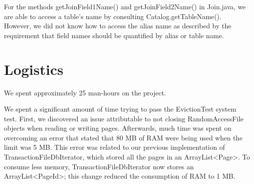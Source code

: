 \documentclass[paper=a4, fontsize=11pt]{scrartcl} %
\numberwithin{equation}{section} %
\numberwithin{figure}{section} %
\numberwithin{table}{section} %
\begin{document}
For the methods getJoinField1Name() and getJoinField2Name() in Join.java, we are able to access a table's name by consulting Catalog.getTableName(). However, we did not know how to access the alias name as described by the requirement that field names should be quantified by alias or table name.




\section{Logistics}

We spent approximately 25 man-hours on the project.

We spent a significant amount of time trying to pass the EvictionTest system test. First, we discovered an issue attributable to not closing RandomAccessFile objects when reading or writing pages. Afterwards, much time was spent on overcoming an error that stated that 80 MB of RAM were being used when the limit was 5 MB. This error was related to our previous implementation of TransactionFileDbIterator, which stored all the pages in an ArrayList<Page>. To consume less memory, TransactionFileDbIterator now stores an ArrayList<PageId>; this change reduced the consumption of RAM to 1 MB.
\end{document}
